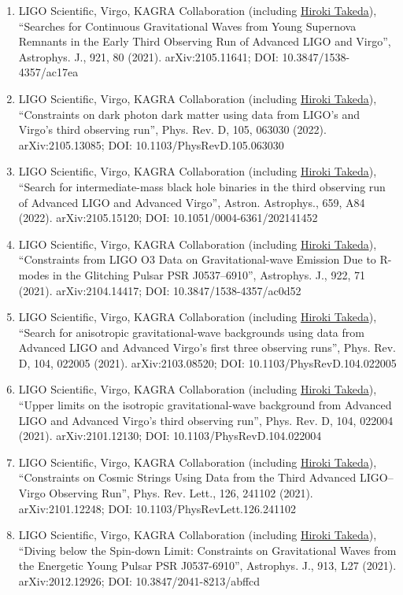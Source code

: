 \documentclass[uplatex, 12pt]{article}
\begin{document}
\begin{enumerate}
\item LIGO Scientific, Virgo, KAGRA Collaboration (including \uline{Hiroki Takeda}), “Searches for Continuous Gravitational Waves from Young Supernova Remnants in the Early Third Observing Run of Advanced LIGO and Virgo”, Astrophys. J., 921, 80 (2021). arXiv:2105.11641; DOI: 10.3847/1538-4357/ac17ea
\item LIGO Scientific, Virgo, KAGRA Collaboration (including \uline{Hiroki Takeda}), “Constraints on dark photon dark matter using data from LIGO's and Virgo's third observing run”, Phys. Rev. D, 105, 063030 (2022). arXiv:2105.13085; DOI: 10.1103/PhysRevD.105.063030
\item LIGO Scientific, Virgo, KAGRA Collaboration (including \uline{Hiroki Takeda}), “Search for intermediate-mass black hole binaries in the third observing run of Advanced LIGO and Advanced Virgo”, Astron. Astrophys., 659, A84 (2022). arXiv:2105.15120; DOI: 10.1051/0004-6361/202141452
\item LIGO Scientific, Virgo, KAGRA Collaboration (including \uline{Hiroki Takeda}), “Constraints from LIGO O3 Data on Gravitational-wave Emission Due to R-modes in the Glitching Pulsar PSR J0537–6910”, Astrophys. J., 922, 71 (2021). arXiv:2104.14417; DOI: 10.3847/1538-4357/ac0d52
\item LIGO Scientific, Virgo, KAGRA Collaboration (including \uline{Hiroki Takeda}), “Search for anisotropic gravitational-wave backgrounds using data from Advanced LIGO and Advanced Virgo's first three observing runs”, Phys. Rev. D, 104, 022005 (2021). arXiv:2103.08520; DOI: 10.1103/PhysRevD.104.022005
\item LIGO Scientific, Virgo, KAGRA Collaboration (including \uline{Hiroki Takeda}), “Upper limits on the isotropic gravitational-wave background from Advanced LIGO and Advanced Virgo's third observing run”, Phys. Rev. D, 104, 022004 (2021). arXiv:2101.12130; DOI: 10.1103/PhysRevD.104.022004
\item LIGO Scientific, Virgo, KAGRA Collaboration (including \uline{Hiroki Takeda}), “Constraints on Cosmic Strings Using Data from the Third Advanced LIGO–Virgo Observing Run”, Phys. Rev. Lett., 126, 241102 (2021). arXiv:2101.12248; DOI: 10.1103/PhysRevLett.126.241102
\item LIGO Scientific, Virgo, KAGRA Collaboration (including \uline{Hiroki Takeda}), “Diving below the Spin-down Limit: Constraints on Gravitational Waves from the
Energetic Young Pulsar PSR J0537-6910”, Astrophys. J., 913, L27 (2021). arXiv:2012.12926; DOI: 10.3847/2041-8213/abffcd

\end{enumerate}
\end{document}
